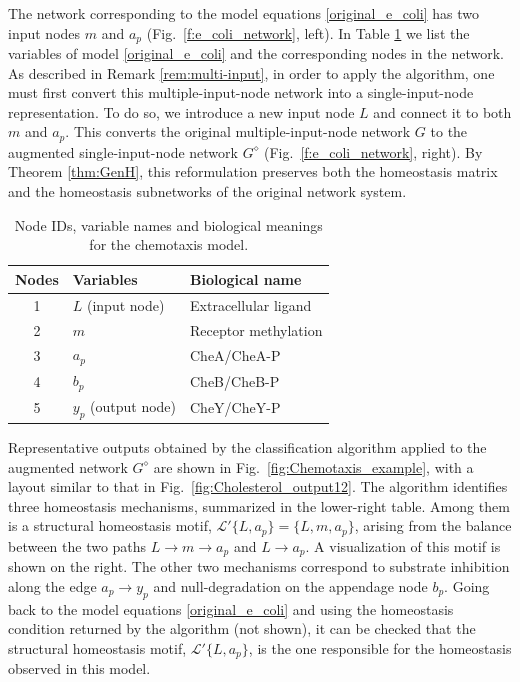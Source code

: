 \documentclass[pdflatex,sn-basic,Numbered]{sn-jnl}
\newcommand{\LL}{{\mathcal L}}
\theoremstyle{thmstyleone}%
\numberwithin{equation}{section}
\begin{document}
The network corresponding to the model equations \eqref{original_e_coli} has two input nodes $m$ and $a_p$ (Fig.~\ref{f:e_coli_network}, left).
In Table \ref{tab:variable_map_chemotaxis} we list the variables
of model \eqref{original_e_coli} and the corresponding nodes in the network.
As described in Remark \ref{rem:multi-input}, in order to apply the algorithm, one must first convert this multiple-input-node network into a single-input-node representation. To do so, we introduce a new input node $L$ and connect it to both $m$ and $a_p$. This converts the original multiple-input-node network $G$ to the augmented single-input-node network $G^\diamond$ (Fig.~\ref{f:e_coli_network}, right). By Theorem \ref{thm:GenH}, this reformulation preserves both the homeostasis matrix and the homeostasis subnetworks of the original network system. 

\begin{table}[!ht]
\centering
\begin{tabular}{cl l}
\toprule
Nodes & Variables & Biological name \\
\midrule
1 & $L$ (input node) & Extracellular ligand\\
2 & $m$ & Receptor methylation \\
3 & $a_p$ & CheA/CheA-P \\
4 & $b_p$ & CheB/CheB-P\\
5 & $y_p$ (output node) & CheY/CheY-P\\
\bottomrule
\end{tabular}
\caption{Node IDs, variable names and biological meanings for the chemotaxis model.}
\label{tab:variable_map_chemotaxis}
\end{table}

Representative outputs obtained by the classification algorithm applied to the augmented network $G^\diamond$ are shown in Fig.~\ref{fig:Chemotaxis_example}, with a layout similar to that in Fig.~\ref{fig:Cholesterol_output12}. The algorithm identifies three homeostasis mechanisms, summarized in the lower-right table. Among them is a structural homeostasis motif, $\LL'\{L, a_p\}=\{L,m,a_p\}$, arising from the balance between the two paths $L\to m\to a_p$ and $L\to a_p$. A visualization of this motif is shown on the right. The other two mechanisms correspond to substrate inhibition along the edge $a_p\to y_p$ and null-degradation on the appendage node $b_p$. 
Going back to the model equations \eqref{original_e_coli} and using the homeostasis condition returned by the algorithm (not shown), it can be checked that the structural homeostasis motif, $\LL'\{L, a_p\}$, is the one responsible for the homeostasis observed in this model.
\end{document}
